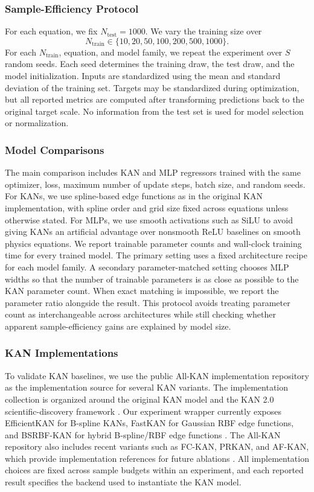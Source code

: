 \documentclass{article}
\begin{document}
\subsubsection{Sample-Efficiency Protocol}

For each equation, we fix $N_{\mathrm{test}}=1000$.
We vary the training size over
\[
N_{\mathrm{train}}\in\{10,20,50,100,200,500,1000\}.
\]
For each $N_{\mathrm{train}}$, equation, and model family, we repeat the experiment over $S$ random seeds.
Each seed determines the training draw, the test draw, and the model initialization.
Inputs are standardized using the mean and standard deviation of the training set.
Targets may be standardized during optimization, but all reported metrics are computed after transforming predictions back to the original target scale.
No information from the test set is used for model selection or normalization.

\subsubsection{Model Comparisons}

The main comparison includes KAN and MLP regressors trained with the same optimizer, loss, maximum number of update steps, batch size, and random seeds.
For KANs, we use spline-based edge functions as in the original KAN implementation, with spline order and grid size fixed across equations unless otherwise stated.
For MLPs, we use smooth activations such as SiLU to avoid giving KANs an artificial advantage over nonsmooth ReLU baselines on smooth physics equations.
We report trainable parameter counts and wall-clock training time for every trained model.
The primary setting uses a fixed architecture recipe for each model family.
A secondary parameter-matched setting chooses MLP widths so that the number of trainable parameters is as close as possible to the KAN parameter count.
When exact matching is impossible, we report the parameter ratio alongside the result.
This protocol avoids treating parameter count as interchangeable across architectures while still checking whether apparent sample-efficiency gains are explained by model size.

\subsubsection{KAN Implementations}

To validate KAN baselines, we use the public All-KAN implementation repository as the implementation source for several KAN variants.
The implementation collection is organized around the original KAN model and the KAN 2.0 scientific-discovery framework \cite{liu2024kan,liu2024kan2}.
Our experiment wrapper currently exposes EfficientKAN for B-spline KANs, FastKAN for Gaussian RBF edge functions, and BSRBF-KAN for hybrid B-spline/RBF edge functions \cite{li2024kolmogorovarnold,ta2024bsrbf}.
The All-KAN repository also includes recent variants such as FC-KAN, PRKAN, and AF-KAN, which provide implementation references for future ablations \cite{ta2024fc,ta2025prkan,ta2025afkan}.
All implementation choices are fixed across sample budgets within an experiment, and each reported result specifies the backend used to instantiate the KAN model.
\end{document}
